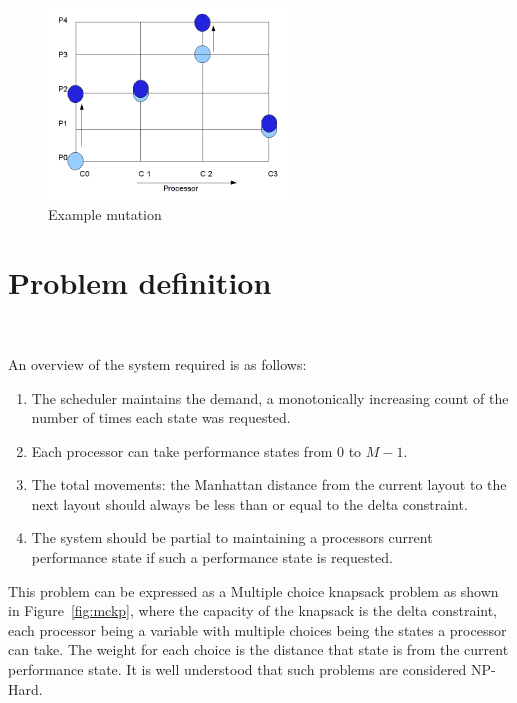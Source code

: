 \begin{figure}[h!]
  \begin{center}
    \includegraphics[height=2in]{figures/example_mutation_3.png}%
    \caption{Example mutation}
    \label{fig:ex_mutation}
  \end{center}
\end{figure}



\section{Problem definition}~\label{sec:ago}

An overview of the system required is as follows:
\begin{enumerate}
\item The scheduler maintains the demand, a monotonically increasing count of the number
of times each state was requested. 
\item Each processor can take performance states from $0$ to $M-1$. 
\item The total movements: the Manhattan distance from the current layout to the next layout 
should always be less than or equal to the delta constraint. 
\item The system should be partial to maintaining a processors current performance state if such a performance state is requested.
\end{enumerate}

This problem can be expressed as a Multiple choice knapsack problem as shown in Figure~\ref{fig:mckp}, where the capacity of the knapsack 
is the delta constraint, each processor being a variable with multiple choices being the states 
a processor can take. The weight for each choice is the distance that state is from the current 
performance state. It is well understood that such problems are considered NP-Hard.

